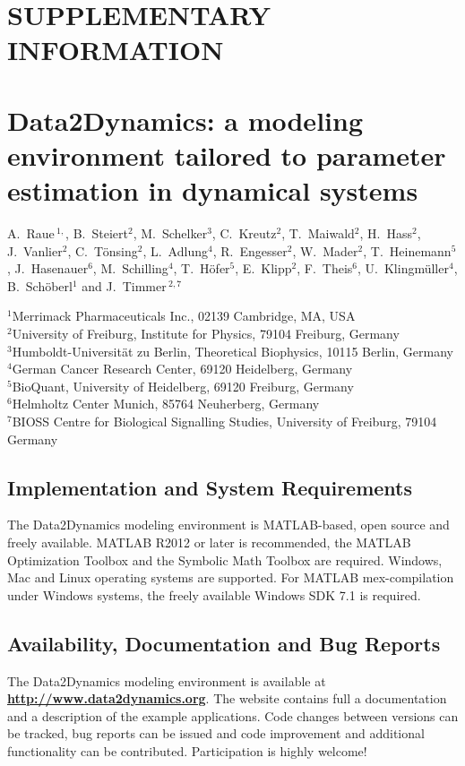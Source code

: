 \documentclass[12pt,a4paper]{scrartcl}
\begin{document}
\section*{SUPPLEMENTARY INFORMATION}
\section*{Data2Dynamics: a modeling environment tailored to parameter 
estimation in dynamical systems}

\noindent 
A.~Raue\,$^{1,}$, 
B.~Steiert$^{2}$, 
M.~Schelker$^{3}$, 
C.~Kreutz$^{2}$, 
T.~Maiwald$^{2}$, 
H.~Hass$^{2}$, 
J.~Vanlier$^{2}$, 
C.~T\"onsing$^{2}$, 
L.~Adlung$^{4}$, 
R.~Engesser$^{2}$, 
W.~Mader$^{2}$, 
T.~Heinemann$^{5}$, 
J.~Hasenauer$^{6}$, 
M.~Schilling$^{4}$, 
T.~H\"ofer$^{5}$, 
E.~Klipp$^{2}$, 
F.~Theis$^{6}$, 
U.~Klingm\"uller$^{4}$, 
B.~Sch\"oberl$^{1}$ and 
J.~Timmer\,$^{2,7}$

\noindent $^{1}$Merrimack Pharmaceuticals Inc., 02139 Cambridge, MA, USA\\
$^{2}$University of Freiburg, Institute for Physics, 79104 Freiburg, Germany\\
$^{3}$Humboldt-Universit\"at zu Berlin, Theoretical Biophysics, 10115 Berlin, Germany\\
$^{4}$German Cancer Research Center, 69120 Heidelberg, Germany\\
$^{5}$BioQuant, University of Heidelberg, 69120 Freiburg, Germany\\
$^{6}$Helmholtz Center Munich, 85764 Neuherberg, Germany\\
$^{7}$BIOSS Centre for Biological Signalling Studies, University of Freiburg, 79104
Germany

\subsection*{Implementation and System Requirements} 
The Data2Dynamics modeling environment is MATLAB-based, 
open source and freely available. 
MATLAB R2012 or later is recommended, the MATLAB 
Optimization Toolbox and the Symbolic Math Toolbox are required. 
Windows, Mac and Linux operating systems are supported. 
For MATLAB mex-compilation under Windows systems, 
the freely available Windows SDK 7.1 is required.

\subsection*{Availability, Documentation and Bug Reports}
The Data2Dynamics modeling environment is available at 
\href{http://www.data2dynamics.org}{{\bf http://www.data2dynamics.org}}. 
The website contains full a documentation and a 
description of the example applications. Code changes between versions can be tracked, 
bug reports can be issued and code improvement 
and additional functionality can be contributed. Participation is highly welcome! 
\end{document}
